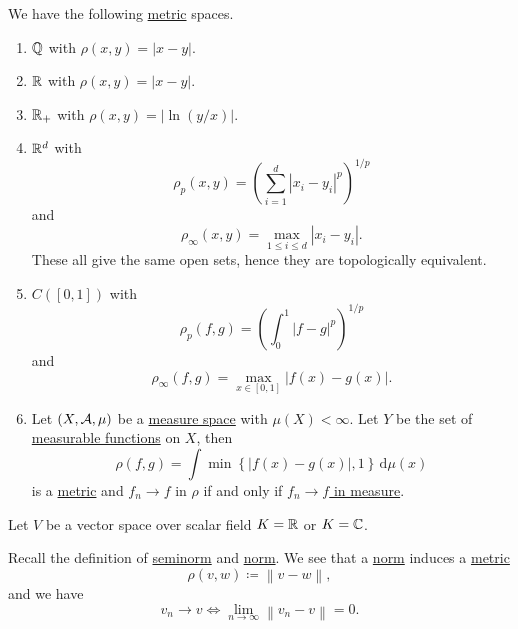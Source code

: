 \begin{eg}
	We have the following \hyperref[def:metric]{metric} spaces.
	\begin{enumerate}[(1)]
		\item \(\mathbb{\MakeUppercase{q}}\) with \(\rho (x, y) = \left\vert x - y \right\vert \).
		\item \(\mathbb{\MakeUppercase{r}}\) with \(\rho (x, y) = \left\vert x - y \right\vert \).
		\item \(\mathbb{\MakeUppercase{r}}_+\) with \(\rho (x, y) = \left\vert \ln (y / x)\right\vert \).
		\item \(\mathbb{\MakeUppercase{r}}^d\) with
		      \[
			      \rho _p(x, y) = \left(\sum\limits_{i=1}^{d} \left\vert x_{i} - y_{i} \right\vert^p \right)^{1 / p}
		      \]
		      and
		      \[
			      \rho _\infty (x, y ) = \mathop{\max} _{1\leq i\leq d}\left\vert x_{i} - y_{i} \right\vert.
		      \]
		      These all give the same open sets, hence they are topologically equivalent.
		\item \(C([0, 1])\) with
		      \[
			      \rho _p(f, g) = \left(\int _0^1 \left\vert f-g \right\vert^p \right)^{1 / p}
		      \]
		      and
		      \[
			      \rho _\infty (f, g) = \mathop{\max} _{x\in[0, 1]}\left\vert f(x) - g(x) \right\vert.
		      \]
		\item Let \((X, \mathcal{\MakeUppercase{a}} , \mu )\) be a \hyperref[def:measure-space]{measure space} with \(\mu (X)< \infty \). Let \(Y\) be the set of
		      \hyperref[def:measurable-function]{measurable functions} on \(X\), then
		      \[
			      \rho (f, g) = \int \mathop{\min} \left\{\left\vert f(x) - g(x) \right\vert, 1 \right\}\,\mathrm{d} \mu (x)
		      \]
		      is a \hyperref[def:metric]{metric} and \(f_{n} \to f\) in \(\rho\) if and only if \hyperref[def:converge-in-measure]{\(f_n \to f\) in measure}.
	\end{enumerate}
\end{eg}

Let \(V\) be a vector space over scalar field \(K = \mathbb{\MakeUppercase{r}} \) or \(K = \mathbb{\MakeUppercase{c}} \).
\begin{prev}\label{induced-metric}
	Recall the definition of \hyperref[def:seminorm]{seminorm} and \hyperref[def:norm]{norm}. We see that a \hyperref[def:norm]{norm} induces a \hyperref[def:metric]{metric}
	\[
		\rho (v, w) \coloneqq \left\lVert v - w\right\rVert,
	\]
	and we have
	\[
		v_{n} \to v \iff \lim\limits_{n \to \infty} \left\lVert v_{n} - v\right\rVert = 0.
	\]
\end{prev}

